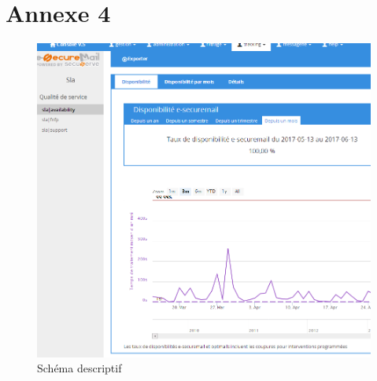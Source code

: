 \section{Annexe 4}
\begin{figure}[!h]
\begin{center}
\includegraphics[width=15cm]{image/page_sla.png}
\end{center}
\caption{Schéma descriptif}
\end{figure}